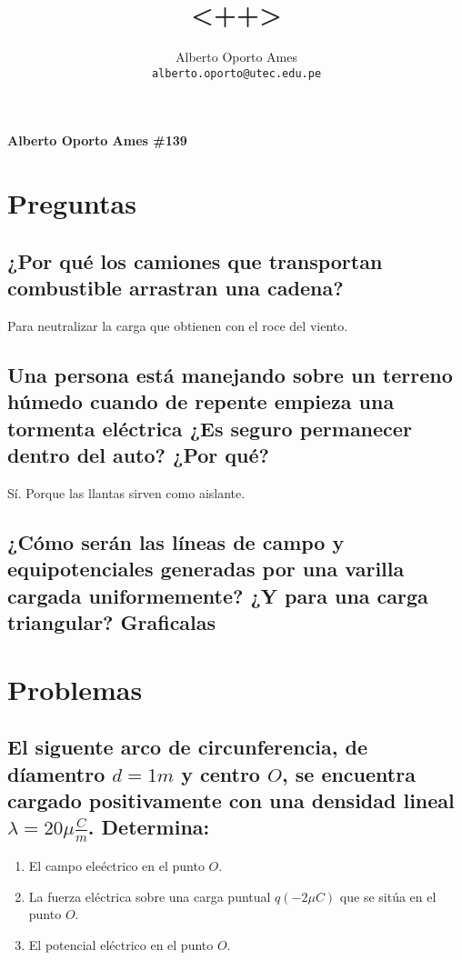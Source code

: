 \documentclass[12pt, twoside]{article}
\title{\textbf{<++>}}
\author{
		Alberto Oporto Ames\\
		\texttt{alberto.oporto@utec.edu.pe}\\
		}
\begin{document}
\textbf{Alberto Oporto Ames \#139}
\thispagestyle{fancy}

\section{Preguntas}%
\label{sec:Preguntas}

\subsection*{¿Por qué los camiones que transportan combustible arrastran una cadena?}%
Para neutralizar la carga que obtienen con el roce del viento.

\subsection*{Una persona está manejando sobre un terreno húmedo cuando de repente
empieza una tormenta eléctrica
¿Es seguro permanecer dentro del auto? ¿Por qué?}%
Sí.
Porque las llantas sirven como aislante.

\subsection*{¿Cómo serán las líneas de campo y equipotenciales generadas por una
varilla cargada uniformemente? ¿Y para una carga triangular?
Graficalas}%

\begin{figure}[H]
	\centering
	\begin{floatrow}
		\ffigbox{}{}
		\ffigbox{}{}
	\end{floatrow}
\end{figure}


\section{Problemas}%
\label{sec:Problemas}
\subsection*{El siguente arco de circunferencia, de díamentro $d = 1m$ y centro $O$,
se encuentra cargado positivamente con una densidad lineal $\lambda = 20\mu \frac{C}{m}$.
Determina:}%
\begin{enumerate}[label=\textbf{\alph*)}]
	\item El campo eleéctrico en el punto $O$.
	\item La fuerza eléctrica sobre una carga puntual $q(-2\mu C)$ que se sitúa en el punto $O$.
	\item El potencial eléctrico en el punto $O$.
\end{enumerate}
\end{document}

